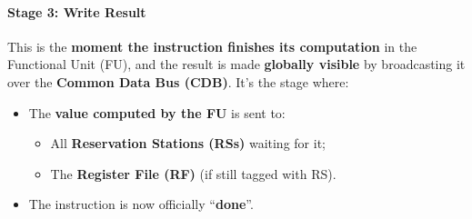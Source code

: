 \paragraph{Stage 3: Write Result}

This is the \textbf{moment the instruction finishes its computation} in the Functional Unit (FU), and the result is made \textbf{globally visible} by broadcasting it over the \textbf{Common Data Bus (CDB)}. It's the stage where:
\begin{itemize}
    \item The \textbf{value computed by the FU} is sent to:
    \begin{itemize}
        \item All \textbf{Reservation Stations (RSs)} waiting for it;
        \item The \textbf{Register File (RF)} (if still tagged with RS).
    \end{itemize}
    \item The instruction is now officially ``\textbf{done}''.
\end{itemize}

